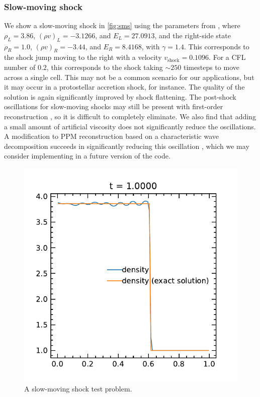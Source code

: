 \documentclass[fleqn,usenatbib]{mnras}
\begin{document}
\subsubsection{Slow-moving shock}
We show a slow-moving shock in \autoref{fig:sms} using the parameters from \cite{Jin_1996}, where $\rho_L = 3.86$, $(\rho v)_L = -3.1266$, and $E_L = 27.0913$, and the right-side state $\rho_R = 1.0$, $(\rho v)_R = -3.44$, and $E_R = 8.4168$, with $\gamma = 1.4$. This corresponds to the shock jump moving to the right with a velocity $v_{\text{shock}} = 0.1096$. For a CFL number of $0.2$, this corresponds to the shock taking $\sim 250$ timesteps to move across a single cell. This may not be a common scenario for our applications, but it may occur in a protostellar accretion shock, for instance. The quality of the solution is again significantly improved by shock flattening. The post-shock oscillations for slow-moving shocks may still be present with first-order reconstruction \citep{Jin_1996,Lee_2011}, so it is difficult to completely eliminate. We also find that adding a small amount of artificial viscosity does not significantly reduce the oscillations. A modification to PPM reconstruction based on a characteristic wave decomposition succeeds in significantly reducing this oscillation \citep{Lee_2011}, which we may consider implementing in a future version of the code.
\begin{figure}
    \includegraphics[width=\columnwidth]{hydro_sms_1.0000.pdf}
    \caption{A slow-moving shock test problem.}
    \label{fig:sms}
\end{figure}
\end{document}
